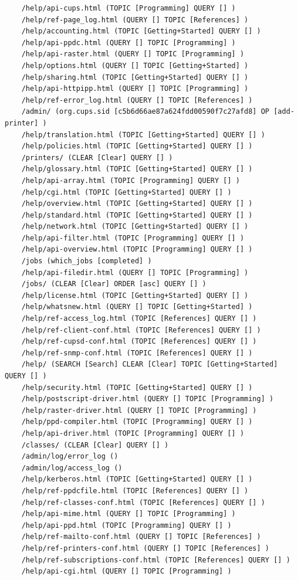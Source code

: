 \documentclass[twoside]{article}
\begin{document}
\begin{lstlisting}
    /help/api-cups.html (TOPIC [Programming] QUERY [] )
    /help/ref-page_log.html (QUERY [] TOPIC [References] )
    /help/accounting.html (TOPIC [Getting+Started] QUERY [] )
    /help/api-ppdc.html (QUERY [] TOPIC [Programming] )
    /help/api-raster.html (QUERY [] TOPIC [Programming] )
    /help/options.html (QUERY [] TOPIC [Getting+Started] )
    /help/sharing.html (TOPIC [Getting+Started] QUERY [] )
    /help/api-httpipp.html (QUERY [] TOPIC [Programming] )
    /help/ref-error_log.html (QUERY [] TOPIC [References] )
    /admin/ (org.cups.sid [c5b6d66ae87a624fdd00590f7c27afd8] OP [add-printer] )
    /help/translation.html (TOPIC [Getting+Started] QUERY [] )
    /help/policies.html (TOPIC [Getting+Started] QUERY [] )
    /printers/ (CLEAR [Clear] QUERY [] )
    /help/glossary.html (TOPIC [Getting+Started] QUERY [] )
    /help/api-array.html (TOPIC [Programming] QUERY [] )
    /help/cgi.html (TOPIC [Getting+Started] QUERY [] )
    /help/overview.html (TOPIC [Getting+Started] QUERY [] )
    /help/standard.html (TOPIC [Getting+Started] QUERY [] )
    /help/network.html (TOPIC [Getting+Started] QUERY [] )
    /help/api-filter.html (TOPIC [Programming] QUERY [] )
    /help/api-overview.html (TOPIC [Programming] QUERY [] )
    /jobs (which_jobs [completed] )
    /help/api-filedir.html (QUERY [] TOPIC [Programming] )
    /jobs/ (CLEAR [Clear] ORDER [asc] QUERY [] )
    /help/license.html (TOPIC [Getting+Started] QUERY [] )
    /help/whatsnew.html (QUERY [] TOPIC [Getting+Started] )
    /help/ref-access_log.html (TOPIC [References] QUERY [] )
    /help/ref-client-conf.html (TOPIC [References] QUERY [] )
    /help/ref-cupsd-conf.html (TOPIC [References] QUERY [] )
    /help/ref-snmp-conf.html (TOPIC [References] QUERY [] )
    /help/ (SEARCH [Search] CLEAR [Clear] TOPIC [Getting+Started] QUERY [] )
    /help/security.html (TOPIC [Getting+Started] QUERY [] )
    /help/postscript-driver.html (QUERY [] TOPIC [Programming] )
    /help/raster-driver.html (QUERY [] TOPIC [Programming] )
    /help/ppd-compiler.html (TOPIC [Programming] QUERY [] )
    /help/api-driver.html (TOPIC [Programming] QUERY [] )
    /classes/ (CLEAR [Clear] QUERY [] )
    /admin/log/error_log ()
    /admin/log/access_log ()
    /help/kerberos.html (TOPIC [Getting+Started] QUERY [] )
    /help/ref-ppdcfile.html (TOPIC [References] QUERY [] )
    /help/ref-classes-conf.html (TOPIC [References] QUERY [] )
    /help/api-mime.html (QUERY [] TOPIC [Programming] )
    /help/api-ppd.html (TOPIC [Programming] QUERY [] )
    /help/ref-mailto-conf.html (QUERY [] TOPIC [References] )
    /help/ref-printers-conf.html (QUERY [] TOPIC [References] )
    /help/ref-subscriptions-conf.html (TOPIC [References] QUERY [] )
    /help/api-cgi.html (QUERY [] TOPIC [Programming] )
    


\end{lstlisting}
\end{document}
